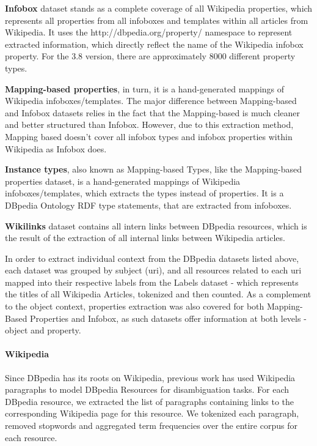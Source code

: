 \documentclass[10pt,a4paper]{article}
\begin{document}

\textbf{Infobox} dataset stands as a complete coverage of all Wikipedia properties, which represents all properties from all infoboxes and templates within all articles from Wikipedia. It uses the http://dbpedia.org/property/  namespace  to represent extracted information, which directly reflect the name of the Wikipedia infobox property. For the 3.8 version, there are approximately 8000 different property types.

\textbf{Mapping-based properties}, in turn, it is a hand-generated mappings of Wikipedia infoboxes/templates. The major difference between Mapping-based and Infobox datasets relies in the fact that the Mapping-based is much cleaner and better structured than Infobox. However,  due to this extraction method, Mapping based  doesn't cover all infobox types and infobox properties within Wikipedia as Infobox does.

\textbf{Instance types}, also known as Mapping-based Types, like the Mapping-based properties dataset, is a hand-generated mappings of Wikipedia infoboxes/templates, which extracts the types instead of properties. It is a DBpedia Ontology RDF type statements, that are extracted from infoboxes.

\textbf{Wikilinks} dataset contains all intern links between DBpedia resources, which is the result of the extraction of all internal links between Wikipedia articles.

In order to extract individual context from the DBpedia datasets listed above, each dataset was grouped by subject (uri), and all resources related to each uri mapped into their respective labels from the Labels dataset - which represents the titles of all Wikipedia Articles, tokenized and then counted. As a complement to the object context,  properties extraction was also covered for both Mapping-Based Properties and Infobox, as such datasets offer information at both levels - object and property.



\paragraph{Wikipedia}
Since DBpedia has its roots on Wikipedia, previous work \cite{isem11mendes} has used Wikipedia paragraphs to model DBpedia Resources for disambiguation tasks.
For each DBpedia resource, we extracted the list of paragraphs containing links to the corresponding Wikipedia page for this resource. 
We tokenized each paragraph, removed stopwords and aggregated term frequencies over the entire corpus for each resource.
\end{document}
